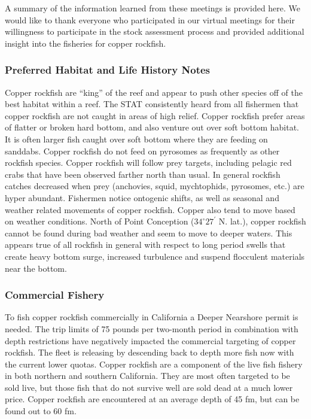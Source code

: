 \documentclass[11pt,
  english,
  letterpaper,
]{article}
\begin{document}
A summary of the information learned from these meetings is provided here. We would like to thank everyone who participated in our virtual meetings for their willingness to participate in the stock assessment process and provided additional insight into the fisheries for copper rockfish.

\hypertarget{preferred-habitat-and-life-history-notes}{%
\subsubsection{Preferred Habitat and Life History Notes}\label{preferred-habitat-and-life-history-notes}}

Copper rockfish are ``king'' of the reef and appear to push other species off of the best habitat within a reef. The STAT consistently heard from all fishermen that copper rockfish are not caught in areas of high relief. Copper rockfish prefer areas of flatter or broken hard bottom, and also venture out over soft bottom habitat. It is often larger fish caught over soft bottom where they are feeding on sanddabs. Copper rockfish do not feed on pyrosomes as frequently as other rockfish species. Copper rockfish will follow prey targets, including pelagic red crabs that have been observed farther north than usual. In general rockfish catches decreased when prey (anchovies, squid, mychtophids, pyrosomes, etc.) are hyper abundant. Fishermen notice ontogenic shifts, as well as seasonal and weather related movements of copper rockfish. Copper also tend to move based on weather conditions. North of Point Conception ($34^\circ 27^\prime$ N. lat.), copper rockfish cannot be found during bad weather and seem to move to deeper waters. This appears true of all rockfish in general with respect to long period swells that create heavy bottom surge, increased turbulence and suspend flocculent materials near the bottom.

\hypertarget{commercial-fishery-1}{%
\subsubsection{Commercial Fishery}\label{commercial-fishery-1}}

To fish copper rockfish commercially in California a Deeper Nearshore permit is needed. The trip limits of 75 pounds per two-month period in combination with depth restrictions have negatively impacted the commercial targeting of copper rockfish. The fleet is releasing by descending back to depth more fish now with the current lower quotas. Copper rockfish are a component of the live fish fishery in both northern and southern California. They are most often targeted to be sold live, but those fish that do not survive well are sold dead at a much lower price. Copper rockfish are encountered at an average depth of 45 fm, but can be found out to 60 fm.
\end{document}
